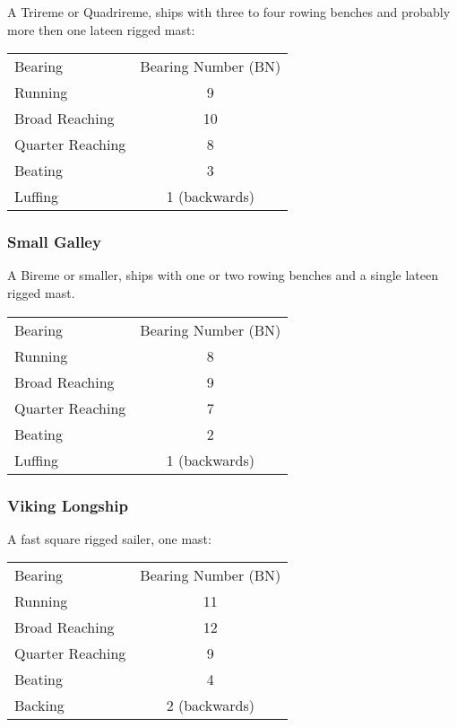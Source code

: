 \documentclass[11pt]{wbzine}
\begin{document}
\begin{multicols}{2}
A Trireme or Quadrireme, ships with three to four rowing benches and
probably more then one lateen rigged mast:


\begin{tabularx}{\columnwidth}{Zc}
Bearing & Bearing Number (BN) \\
Running & 9 \\
Broad Reaching & 10 \\
Quarter Reaching & 8 \\
Beating & 3 \\
Luffing & 1 (backwards) \\
\end{tabularx}

\subsubsection{Small Galley}

A Bireme or smaller, ships with one or two rowing benches and a single
lateen rigged mast.

\begin{tabularx}{\columnwidth}{Zc}
Bearing & Bearing Number (BN) \\
Running & 8 \\
Broad Reaching & 9 \\
Quarter Reaching & 7 \\
Beating & 2 \\
Luffing & 1 (backwards) \\
\end{tabularx}

\subsubsection{Viking Longship}

A fast square rigged sailer, one mast:


\begin{tabularx}{\columnwidth}{Zc}
Bearing & Bearing Number (BN) \\
Running & 11 \\
Broad Reaching & 12 \\
Quarter Reaching & 9 \\
Beating & 4 \\
Backing & 2 (backwards) \\
\end{tabularx}


\end{multicols}
\end{document}
